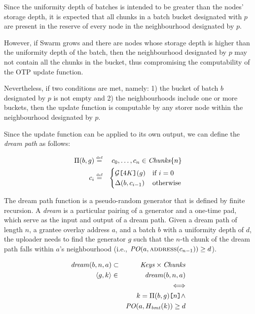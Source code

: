 Since the uniformity depth of batches is intended to be greater than the nodes' storage depth, it is expected that all chunks in a batch bucket designated with $p$ are present in the reserve of every node in the neighbourhood designated by $p$. 

However, if Swarm grows and there are nodes whose storage  depth is higher than the uniformity depth of the batch, then the neighbourhood designated by $p$ may not contain all the
chunks in the bucket, thus compromising the computability of the OTP update function.

Nevertheless, if two conditions are met, namely: 1) the bucket of batch $b$ designated by $p$ is not empty and 2) the neighbourhoods include one or more buckets, then the update function is computable by any storer node within the neighbourhood designated by $p$.

Since the update function can be applied to its own output, we can define the \emph{dream path} as follows:


\begin{eqnarray}
\Pi(b,g)&\overset{\textrm{\tiny def}}{=}&c_0,\ldots, c_n\in\mathit{Chunks}\{n\}\\
c_i&\overset{\textrm{\tiny def}}{=}&\begin{cases}
\mathcal{G}\texttt{[}\/4K\/\texttt{]}(g) &\text{if }i=0\\   
\Delta(b,c_{i-1}) &\text{otherwise}
\end{cases}
\end{eqnarray}

The dream path function is a pseudo-random generator that is defined by finite recursion. A \emph{dream} is a particular pairing of a generator and a one-time pad, which serve as the input and output of a dream path.
Given a dream path of length $n$, a grantee overlay address $a$, and a batch $b$ with a uniformity depth of $d$, the uploader needs to find the generator $g$ such that the $n$-th chunk of the dream path falls within $a$'s neighbourhood (i.e., $\mathit{PO}(a,\textsc{address}(c_{n-1}))\geq d$).

\begin{eqnarray}
\mathit{dream}(b,n,a) &\subset &\mathit{Keys}\times\mathit{Chunks}\\
\langle g, k\rangle &\in& \mathit{dream}(b,n,a) \\
&&\Longleftrightarrow\\
&&k=\Pi(b,g)\texttt{[}\/n\/\texttt{]}
\land\\
&&\mathit{PO}(a,H_{\mathit{bmt}}(k))\geq d
\end{eqnarray}


